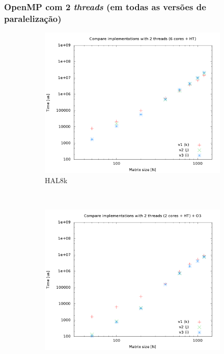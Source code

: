 \documentclass[a4paper, 12pt]{article}
\begin{document}
\newpage
\subsubsection{OpenMP com 2 \textit{threads} (em todas as versões de paralelização)}
\begin{figure}[H]
    \centering
    \begin{subfigure}[H]{0.5\textwidth}
        \includegraphics[width=\textwidth]{HAL_cmp_versions-2t}
        \caption{HAL8k}
        \label{fig:8k_cmp_2t}
    \end{subfigure}%
    ~ %
    \begin{subfigure}[H]{0.5\textwidth}
        \includegraphics[width=\textwidth]{hpops2_O3_cmp_versions-2t}

\end{subfigure}
\end{figure}
\end{document}
